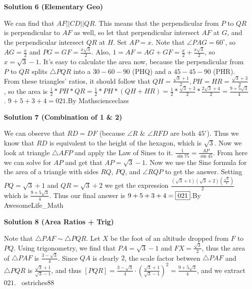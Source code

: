 \begin{enumerate}
 



\textbf{Solution 6 (Elementary Geo)}

We can find that $AF || CD || QR$. This means that the perpendicular from $P$ to $QR$ is perpendicular to $AF$ as well, so let that perpendicular intersect $AF$ at $G$, and the perpendicular intersect $QR$ at $H$. Set $AP=x$. Note that $\angle {PAG} = 60^\circ$, so $AG=\frac{x}{2}$ and $PG = GF = \frac{x\sqrt3}{2}$. Also, $1=AF=AG+GF=\frac{x}{2} + \frac{x\sqrt{3}}{2}$, so $x=\sqrt{3} - 1$. It's easy to calculate the area now, because the perpendicular from $P$ to $QR$ splits $\triangle{PQR}$ into a $30-60-90$ (PHQ) and a $45-45-90$ (PHR). From these triangles' ratios, it should follow that $QH=\frac{\sqrt{3} + 1}{2}, PH=HR=\frac{\sqrt{3}+3}{2}$, so the area is $\frac{1}{2} * PH * QR = \frac{1}{2} * PH * (QH + HR) = \frac{1}{2} * \frac{\sqrt{3} + 3}{2} * \frac{2\sqrt{3}+4}{2} = \boxed{\frac{9+5\sqrt{3}}{4}}$. $9+5+3+4=021$.By Mathscienceclass

 



\textbf{Solution 7 (Combination of 1 & 2)}

We can observe that $RD=DF$ (because $\angle R$ & $\angle RFD$ are both $45^\circ$). Thus we know that $RD$ is equivalent to the height of the hexagon, which is $\sqrt3$. Now we look at triangle $\triangle AFP$ and apply the Law of Sines to it. $\frac{1}{\sin{75}}=\frac{AP}{\sin{45}}$. From here we can solve for $AP$ and get that $AP=\sqrt{3}-1$. Now we use the Sine formula for the area of a triangle with sides $RQ$, $PQ$, and $\angle {RQP}$ to get the answer. Setting $PQ=\sqrt{3}+1$ and $QR=\sqrt{3}+2$ we get the expression $\frac{(\sqrt{3}+1)(\sqrt{3}+2)(\frac{\sqrt{3}}{2})}{2}$ which is  $\frac{9 + 5\sqrt{3}}{4}$. Thus our final answer is $9+5+3+4=\fbox{021}$.By AwesomeLife\_Math

 



\textbf{Solution 8 (Area Ratios + Trig)}

Note that $\triangle PAF \sim \triangle PQR$. Let $X$ be the foot of an altitude dropped from $F$ to $PQ$. Using trigonometry, we find that $PA = \sqrt3 - 1$ and $FX = \frac{\sqrt3}{2}$, thus the area of $\triangle PAF$ is $\frac{3 - \sqrt3}{4}$. Since $QA$ is clearly $2$, the scale factor between $\triangle PAF$ and $\triangle PQR$ is $\frac{\sqrt3 + 1}{\sqrt3 - 1}$, and thus $[PQR] = \frac{3 - \sqrt3}{4} \cdot \left( \frac{\sqrt3 + 1}{\sqrt3 - 1} \right)^2 = \frac{9 + 5\sqrt3}{4}$, and we extract $\boxed{021}$. ~ostriches88


\end{enumerate}
